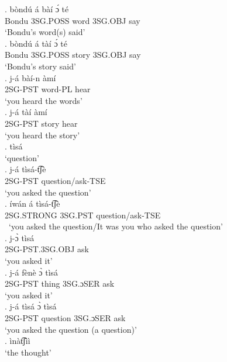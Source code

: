 \documentclass{assets/fieldnotes}
\begin{document}
{\exg. bòndú á bàí ɔ́ té\\
Bondu 3SG.POSS word 3SG.OBJ say\\
`Bondu's word(s) said' \\

\exg. bòndú á tàí ɔ́ té\\
Bondu 3SG.POSS story 3SG.OBJ say\\
`Bondu's story said' \\

\exg. j-á bàí-n àmí\\
2SG-PST word-PL hear\\
`you heard the words' \\

\exg. j-á tàí àmí\\
2SG-PST story hear\\
`you heard the story' \\

\exg. tìsá\\
`question' \\

\exg. j-á tìsá-t͡ʃè\\
2SG-PST question/ask-TSE\\
`you asked the question' \\

\exg. íwán á tìsá-t͡ʃè\\
2SG.STRONG 3SG.PST question/ask-TSE\\\
`you asked the question/It was you who asked the question' \\

\exg. j-ɔ̀ tìsá\\
2SG-PST.3SG.OBJ ask\\
`you asked it' \\

\exg. j-á fènè ɔ̀ tìsá\\
2SG-PST thing 3SG.ɔSER ask\\
`you asked it' \\

\exg. j-á tìsá ɔ̀ tìsá\\
2SG-PST question 3SG.ɔSER ask\\
`you asked the question (a question)' \\


\exg. ìnàt͡ʃìì\\
`the thought' \\

}
\end{document}
